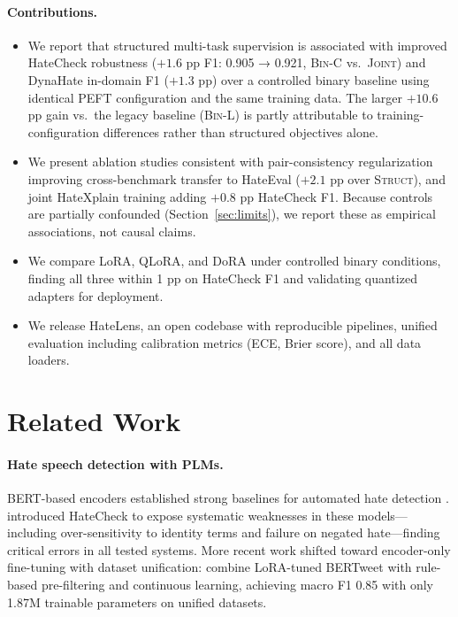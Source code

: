 \documentclass{article}
\newcommand{\method}{HateLens}
\begin{document}
\paragraph{Contributions.}
\begin{itemize}
  \item We report that structured multi-task supervision is associated with
    improved HateCheck robustness ($+1.6$ pp F1: 0.905 → 0.921, \textsc{Bin-C}
    vs.\ \textsc{Joint}) and DynaHate in-domain F1 ($+1.3$ pp) over a
    controlled binary baseline using identical PEFT configuration and the same
    training data.
    The larger $+10.6$ pp gain vs.\ the legacy baseline (\textsc{Bin-L}) is
    partly attributable to training-configuration differences rather than
    structured objectives alone.
  \item We present ablation studies consistent with pair-consistency
    regularization improving cross-benchmark transfer to HateEval ($+2.1$ pp
    over \textsc{Struct}), and joint HateXplain training adding $+0.8$ pp
    HateCheck F1.
    Because controls are partially confounded (Section~\ref{sec:limits}),
    we report these as empirical associations, not causal claims.
  \item We compare LoRA, QLoRA, and DoRA under controlled binary conditions,
    finding all three within 1 pp on HateCheck F1 and validating quantized
    adapters for deployment.
  \item We release \method{}, an open codebase with reproducible pipelines,
    unified evaluation including calibration metrics (ECE, Brier score),
    and all data loaders.
\end{itemize}

\section{Related Work}
\label{sec:related}

\paragraph{Hate speech detection with PLMs.}
BERT-based encoders established strong baselines for automated hate detection
\citep{basile2019semeval,vidgen2021dynahate}.
\citet{rottger2021hatecheck} introduced HateCheck to expose systematic weaknesses
in these models—including over-sensitivity to identity terms and failure on
negated hate—finding critical errors in all tested systems.
More recent work shifted toward encoder-only fine-tuning with dataset
unification: \citet{elbahnasawi2025lora} combine LoRA-tuned BERTweet with
rule-based pre-filtering and continuous learning, achieving macro F1 0.85
with only 1.87M trainable parameters on unified datasets.
\end{document}
